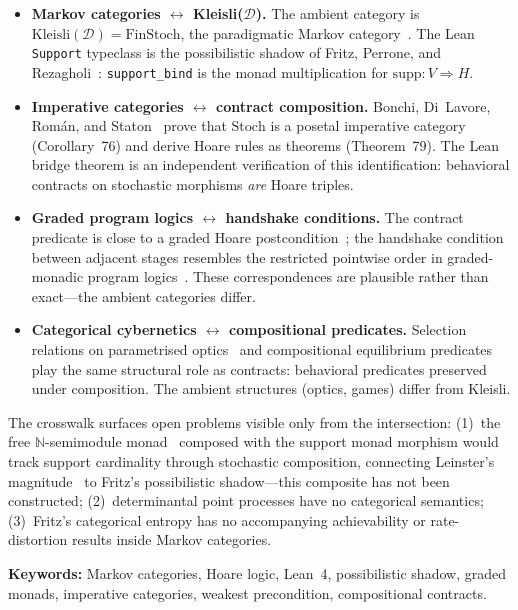 \documentclass[11pt,a4paper]{article}
\begin{document}
\begin{itemize}
\item \textbf{Markov categories $\leftrightarrow$ Kleisli($\mathcal{D}$).}
The ambient category is $\mathrm{Kleisli}(\mathcal{D}) = \mathrm{FinStoch}$, the paradigmatic Markov category~\cite{Fritz2020}. The Lean \texttt{Support} typeclass is the possibilistic shadow of Fritz, Perrone, and Rezagholi~\cite{FPR2021}: \texttt{support\_bind} is the monad multiplication for $\mathrm{supp} : V \Rightarrow H$.

\item \textbf{Imperative categories $\leftrightarrow$ contract composition.}
Bonchi, Di~Lavore, Rom\'an, and Staton~\cite{BDRS2025} prove that $\mathrm{Stoch}$ is a posetal imperative category (Corollary~76) and derive Hoare rules as theorems (Theorem~79). The Lean bridge theorem is an independent verification of this identification: behavioral contracts on stochastic morphisms \emph{are} Hoare triples.

\item \textbf{Graded program logics $\leftrightarrow$ handshake conditions.}
The contract predicate is close to a graded Hoare postcondition~\cite{GKOS2021}; the handshake condition between adjacent stages resembles the restricted pointwise order in graded-monadic program logics~\cite{KGSU2026}. These correspondences are plausible rather than exact---the ambient categories differ.

\item \textbf{Categorical cybernetics $\leftrightarrow$ compositional predicates.}
Selection relations on parametrised optics~\cite{CGHR2021} and compositional equilibrium predicates~\cite{GKLF2020} play the same structural role as contracts: behavioral predicates preserved under composition. The ambient structures (optics, games) differ from Kleisli.
\end{itemize}

\noindent
The crosswalk surfaces open problems visible only from the intersection: (1)~the free $\mathbb{N}$-semimodule monad~\cite{KW2021} composed with the support monad morphism would track support cardinality through stochastic composition, connecting Leinster's magnitude~\cite{Leinster2021} to Fritz's possibilistic shadow---this composite has not been constructed; (2)~determinantal point processes have no categorical semantics; (3)~Fritz's categorical entropy has no accompanying achievability or rate-distortion results inside Markov categories.

\medskip\noindent\textbf{Keywords:} Markov categories, Hoare logic, Lean~4, possibilistic shadow, graded monads, imperative categories, weakest precondition, compositional contracts.
\end{document}
